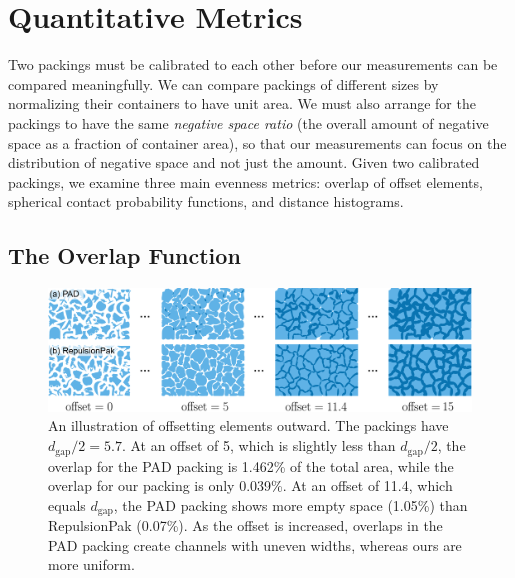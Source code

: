 \section{Quantitative Metrics}


Two packings must be calibrated to each other before our measurements 
can be compared meaningfully.  
We can compare packings of different sizes by normalizing their containers to
have unit area.  We must also arrange for the packings to have the same
\textit{negative space ratio} 
(the overall amount of negative space as a 
fraction of container area), so that our measurements can focus on the
distribution of negative space and not just the amount.  Given two
calibrated packings, we examine three main evenness metrics:
overlap of offset elements, spherical contact probability functions,
and distance histograms. 

\subsection{The Overlap Function}

\begin{figure}[t]
\centering
\includegraphics[width=1.0\textwidth]{figures/metrics/overlap_metric.pdf}
\caption[An illustration of offsetting elements outward]
{\label{fig_overlap_function}
    An illustration of offsetting elements outward. The packings have $d_\mathrm{gap} / 2 = 5.7$.  
    At an offset of 5, which is slightly less than $d_\mathrm{gap} / 2$,
    the overlap for the PAD packing is 1.462\% of the total area, while the overlap for our packing is only 0.039\%.
    At an offset of 11.4, which equals $d_\mathrm{gap}$, the PAD packing shows more empty space (1.05\%) than RepulsionPak (0.07\%).
    As the offset is increased, overlaps in the PAD packing create channels
  with uneven widths, whereas ours are more uniform.
  }
\end{figure}

